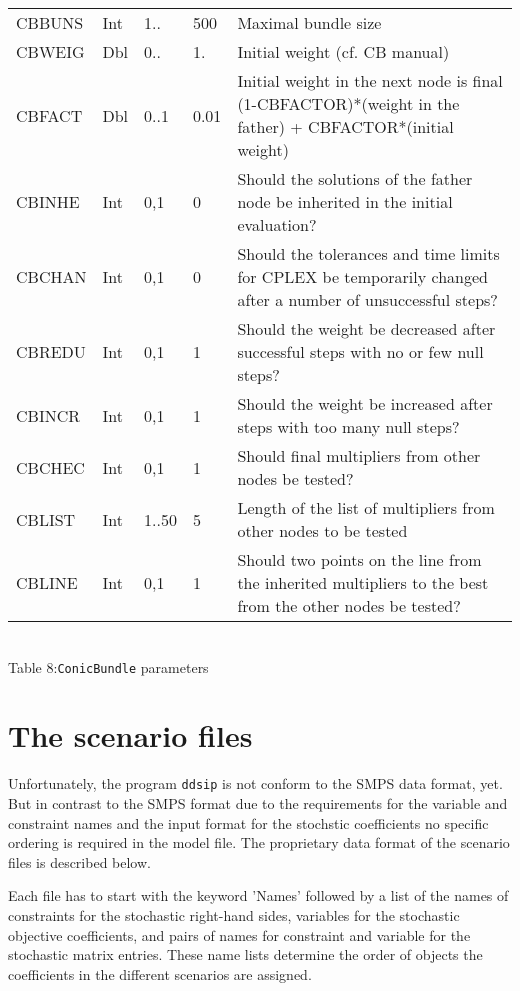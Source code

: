 \documentclass[11pt,draft]{article}
\newcommand{\+}{{\ti{+}}}
\newcommand{\1}{{\ti{1}}}
\begin{document}
\begin{center}
\begin{supertabular}{|llllp{6.6cm}|}
CBBUNS &Int&1..&500&Maximal bundle size\medskip\\ 
CBWEIG &Dbl&0..&1.&Initial weight (cf. CB manual)\\
CBFACT &Dbl&0..1&0.01&Initial weight in the next node is final (1-CBFACTOR)*(weight in the father) + CBFACTOR*(initial weight)\\
CBINHE &Int&0,1&0&Should the solutions of the father node be inherited in the initial evaluation?\medskip\\
CBCHAN &Int&0,1&0&Should the tolerances and time limits for CPLEX be temporarily changed after a number of unsuccessful steps?\medskip\\
CBREDU &Int&0,1&1&Should the weight be decreased after successful steps with no or few null steps?\medskip\\
CBINCR &Int&0,1&1&Should the weight be increased after steps with too many null steps?\medskip\\
CBCHEC &Int&0,1&1&Should final multipliers from other nodes be tested?\medskip\\
CBLIST &Int&1..50&5&Length of the list of multipliers from other nodes to be tested\medskip\\
CBLINE &Int&0,1&1&Should two points on the line from the inherited multipliers to the best from the other nodes be tested?\medskip\\
\hline
\end{supertabular}
\\[0.5em]{Table 8:\quad \texttt{ConicBundle} parameters}
\end{center} %
%
\section{The scenario files}
Unfortunately, the program \texttt{ddsip} is not conform to the SMPS data format, yet. 
But in contrast to the SMPS format due to the requirements for the variable and constraint names and the input format for the stochstic coefficients no specific ordering is required in the model file.
The proprietary data format of the scenario files is described below.

Each file has to start with the keyword 'Names' followed by a list of the names of constraints for the stochastic right-hand sides, variables for the stochastic objective coefficients,
and pairs of names for constraint and variable for the stochastic matrix entries. These name lists determine the order of objects the coefficients in the different scenarios are
assigned.
\end{document}
